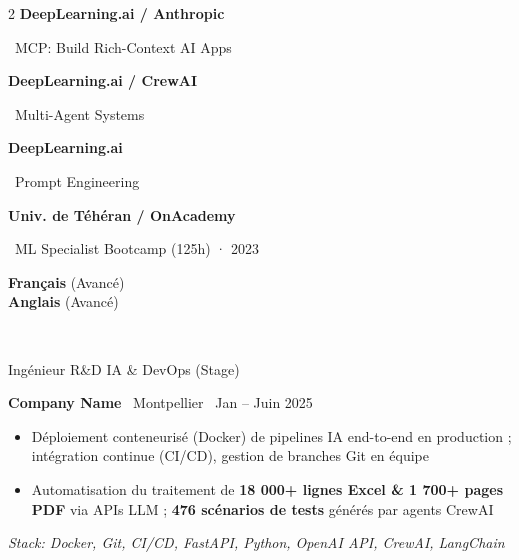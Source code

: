 \documentclass[7pt,a4paper,withhyper]{altacv}
\renewcommand{\cvevent}[4]{%
  {\large\color{emphasis}\raggedright #1\par}
  \smallskip\normalsize
  \ifstrequal{#2}{}{}{%
    \textbf{\color{accent}#2}%
  }%
  \ifstrequal{#4}{}{}{%
    \ifstrequal{#2}{}{}{\hspace{1.5em}}%
    {\small\cvLocationMarker~#4}%
  }%
  \ifstrequal{#3}{}{}{%
    \hfill{\small\cvDateMarker~#3}%
  }\par
}
\begin{document}
\begin{paracol}{2}
\vspace{0.2em}
\smallskip
\noindent\textbf{DeepLearning.ai / Anthropic}\par
\hspace{1em}\raisebox{0.15ex}{\textcolor{accent}{\scriptsize\faStar}}~MCP: Build Rich-Context AI Apps\par
\vspace{0.2em}
\noindent\textbf{DeepLearning.ai / CrewAI}\par
\hspace{1em}\raisebox{0.15ex}{\textcolor{accent}{\scriptsize\faStar}}~Multi-Agent Systems\par
\vspace{0.2em}
\noindent\textbf{DeepLearning.ai}\par
\hspace{1em}\raisebox{0.15ex}{\textcolor{accent}{\scriptsize\faStar}}~Prompt Engineering\par
\vspace{0.2em}
\noindent\textbf{Univ. de Téhéran / OnAcademy}\par
\hspace{1em}\raisebox{0.15ex}{\textcolor{accent}{\scriptsize\faStar}}~ML Specialist Bootcamp (125h) · 2023\par
\hspace{1em}{Python ML · Neural Networks · Computer Vision}\par

\vspace{0.2em}
\textbf{Français} (Avancé)\\\vspace{0.1em}
\textbf{Anglais} (Avancé)\\\vspace{0.1em}\par

\vspace{0.2em}
 \\[-0.15em]
 \par

\switchcolumn
\vspace{-0.5em}


\cvevent{Ingénieur R\&D IA \& DevOps (Stage)}{Company Name}{Jan – Juin 2025}{Montpellier}
\smallskip
\begin{itemize}[leftmargin=1.25em, itemsep=0pt, parsep=0pt]
\item \justifying Déploiement conteneurisé (Docker) de pipelines IA end-to-end en production ; intégration continue (CI/CD), gestion de branches Git en équipe
\item \justifying Automatisation du traitement de \textbf{18 000+ lignes Excel \& 1 700+ pages PDF} via APIs LLM ; \textbf{476 scénarios de tests} générés par agents CrewAI
\end{itemize}
\smallskip\noindent\textit{Stack: Docker, Git, CI/CD, FastAPI, Python, OpenAI API, CrewAI, LangChain}\par


\end{paracol}
\end{document}
